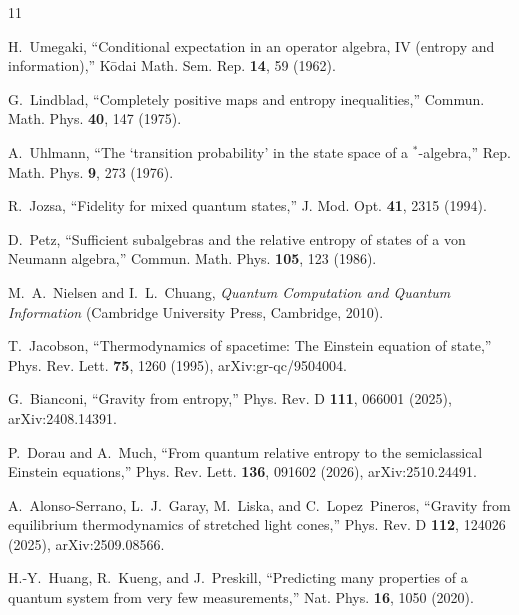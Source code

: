 \documentclass[aps,prd,reprint,nofootinbib,longbibliography]{revtex4-2}
\begin{document}
\begin{thebibliography}{11}

H.~Umegaki,
``Conditional expectation in an operator algebra, IV (entropy and
information),''
K\=odai Math. Sem. Rep. \textbf{14}, 59 (1962).

G.~Lindblad,
``Completely positive maps and entropy inequalities,''
Commun. Math. Phys. \textbf{40}, 147 (1975).

A.~Uhlmann,
``The `transition probability' in the state space of a $^{*}$-algebra,''
Rep. Math. Phys. \textbf{9}, 273 (1976).

R.~Jozsa,
``Fidelity for mixed quantum states,''
J. Mod. Opt. \textbf{41}, 2315 (1994).

D.~Petz,
``Sufficient subalgebras and the relative entropy of states of a von
Neumann algebra,''
Commun. Math. Phys. \textbf{105}, 123 (1986).

M.~A.~Nielsen and I.~L.~Chuang,
\emph{Quantum Computation and Quantum Information}
(Cambridge University Press, Cambridge, 2010).

T.~Jacobson,
``Thermodynamics of spacetime: The Einstein equation of state,''
Phys. Rev. Lett. \textbf{75}, 1260 (1995),
arXiv:gr-qc/9504004.

G.~Bianconi,
``Gravity from entropy,''
Phys. Rev. D \textbf{111}, 066001 (2025),
arXiv:2408.14391.

P.~Dorau and A.~Much,
``From quantum relative entropy to the semiclassical Einstein
equations,''
Phys. Rev. Lett. \textbf{136}, 091602 (2026),
arXiv:2510.24491.

A.~Alonso-Serrano, L.~J.~Garay, M.~Liska, and C.~Lopez~Pineros,
``Gravity from equilibrium thermodynamics of stretched light cones,''
Phys. Rev. D \textbf{112}, 124026 (2025),
arXiv:2509.08566.

H.-Y.~Huang, R.~Kueng, and J.~Preskill,
``Predicting many properties of a quantum system from very few
measurements,''
Nat. Phys. \textbf{16}, 1050 (2020).

\end{thebibliography}
\end{document}

